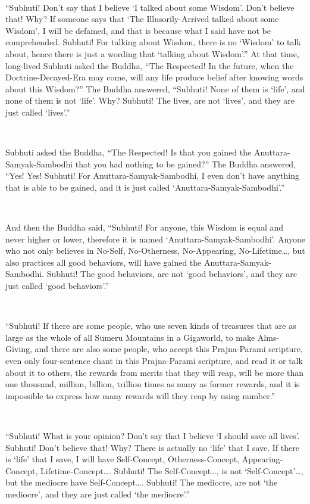 \documentclass[a5paper,12pt]{book}
\begin{document}
    ~
 
     ``Subhuti! Don't say that I believe `I talked about some Wisdom'. Don't believe that! Why? If someone says that `The Illusorily-Arrived talked about some Wisdom', I will be defamed, and that is because what I said have not be comprehended. Subhuti! For talking about Wisdom, there is no `Wisdom' to talk about, hence there is just a wording that `talking about Wisdom'.'' At that time, long-lived Subhuti asked the Buddha, ``The Respected! In the future, when the Doctrine-Decayed-Era may come, will any life produce belief after knowing words about this Wisdom?'' The Buddha answered, ``Subhuti! None of them is `life', and none of them is not `life'. Why? Subhuti! The lives, are not `lives', and they are just called `lives'.''

    ~

     Subhuti asked the Buddha, ``The Respected! Is that you gained the Anuttara-Samyak-Sambodhi that you had nothing to be gained?'' The Buddha answered, ``Yes! Yes! Subhuti! For Anuttara-Samyak-Sambodhi, I even don't have anything that is able to be gained, and it is just called `Anuttara-Samyak-Sambodhi'.''

    ~

     And then the Buddha said, ``Subhuti! For anyone, this Wisdom is equal and never higher or lower, therefore it is named `Anuttara-Samyak-Sambodhi'. Anyone who not only believes in No-Self, No-Otherness, No-Appearing, No-Lifetime\dots{}, but also practices all good behaviors, will have gained the Anuttara-Samyak-Sambodhi. Subhuti! The good behaviors, are not `good behaviors', and they are just called `good behaviors'.''

    ~

     ``Subhuti! If there are some people, who use seven kinds of treasures that are as large as the whole of all Sumeru Mountains in a Gigaworld, to make Alms-Giving, and there are also some people, who accept this Prajna-Parami scripture, even only four-sentence chant in this Prajna-Parami scripture, and read it or talk about it to others, the rewards from merits that they will reap, will be more than one thousand, million, billion, trillion times as many as former rewards, and it is impossible to express how many rewards will they reap by using number.''

    ~

     ``Subhuti! What is your opinion? Don't say that I believe `I should save all lives'. Subhuti! Don't believe that! Why? There is actually no `life' that I save. If there is `life' that I save, I will have Self-Concept, Otherness-Concept, Appearing-Concept, Lifetime-Concept\dots{}. Subhuti! The Self-Concept\dots{}, is not `Self-Concept'\dots{}, but the mediocre have Self-Concept\dots{}. Subhuti! The mediocre, are not `the mediocre', and they are just called `the mediocre'.''
\end{document}
